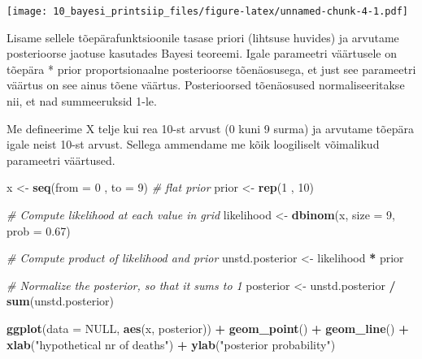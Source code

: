 \documentclass[]{book}
\newenvironment{Shaded}{\begin{snugshade}}{\end{snugshade}}
\newcommand{\CommentTok}[1]{\textcolor[rgb]{0.56,0.35,0.01}{\textit{#1}}}
\newcommand{\DataTypeTok}[1]{\textcolor[rgb]{0.13,0.29,0.53}{#1}}
\newcommand{\DecValTok}[1]{\textcolor[rgb]{0.00,0.00,0.81}{#1}}
\newcommand{\FloatTok}[1]{\textcolor[rgb]{0.00,0.00,0.81}{#1}}
\newcommand{\KeywordTok}[1]{\textcolor[rgb]{0.13,0.29,0.53}{\textbf{#1}}}
\newcommand{\NormalTok}[1]{#1}
\newcommand{\OperatorTok}[1]{\textcolor[rgb]{0.81,0.36,0.00}{\textbf{#1}}}
\newcommand{\OtherTok}[1]{\textcolor[rgb]{0.56,0.35,0.01}{#1}}
\newcommand{\StringTok}[1]{\textcolor[rgb]{0.31,0.60,0.02}{#1}}
\begin{document}
\texttt{[image: 10\_bayesi\_printsiip\_files/figure-latex/unnamed-chunk-4-1.pdf]}

Lisame sellele tõepärafunktsioonile tasase priori (lihtsuse huvides) ja arvutame posterioorse jaotuse kasutades Bayesi teoreemi. Igale parameetri väärtusele on tõepära * prior proportsionaalne posterioorse tõenäosusega, et just see parameetri väärtus on see ainus tõene väärtus. Posterioorsed tõenäosused normaliseeritakse nii, et nad summeeruksid 1-le.

Me defineerime X telje kui rea 10-st arvust (0 kuni 9 surma) ja arvutame tõepära igale neist 10-st arvust. Sellega ammendame me kõik loogiliselt võimalikud parameetri väärtused.



\begin{Shaded}
\begin{Highlighting}[]
\NormalTok{x <-}\StringTok{ }\KeywordTok{seq}\NormalTok{(}\DataTypeTok{from =} \DecValTok{0}\NormalTok{ , }\DataTypeTok{to =} \DecValTok{9}\NormalTok{)}
\CommentTok{# flat prior}
\NormalTok{prior <-}\StringTok{ }\KeywordTok{rep}\NormalTok{(}\DecValTok{1}\NormalTok{ , }\DecValTok{10}\NormalTok{)}

\CommentTok{# Compute likelihood at each value in grid}
\NormalTok{likelihood <-}\StringTok{ }\KeywordTok{dbinom}\NormalTok{(x, }\DataTypeTok{size =} \DecValTok{9}\NormalTok{, }\DataTypeTok{prob =} \FloatTok{0.67}\NormalTok{)}

\CommentTok{# Compute product of likelihood and prior}
\NormalTok{unstd.posterior <-}\StringTok{ }\NormalTok{likelihood }\OperatorTok{*}\StringTok{ }\NormalTok{prior}

\CommentTok{# Normalize the posterior, so that it sums to 1}
\NormalTok{posterior <-}\StringTok{ }\NormalTok{unstd.posterior }\OperatorTok{/}\StringTok{ }\KeywordTok{sum}\NormalTok{(unstd.posterior)}

\KeywordTok{ggplot}\NormalTok{(}\DataTypeTok{data =} \OtherTok{NULL}\NormalTok{, }\KeywordTok{aes}\NormalTok{(x, posterior)) }\OperatorTok{+}\StringTok{ }
\StringTok{  }\KeywordTok{geom_point}\NormalTok{() }\OperatorTok{+}
\StringTok{  }\KeywordTok{geom_line}\NormalTok{() }\OperatorTok{+}
\StringTok{  }\KeywordTok{xlab}\NormalTok{(}\StringTok{"hypothetical nr of deaths"}\NormalTok{) }\OperatorTok{+}\StringTok{ }
\StringTok{  }\KeywordTok{ylab}\NormalTok{(}\StringTok{"posterior probability"}\NormalTok{)}
\end{Highlighting}
\end{Shaded}
\end{document}
